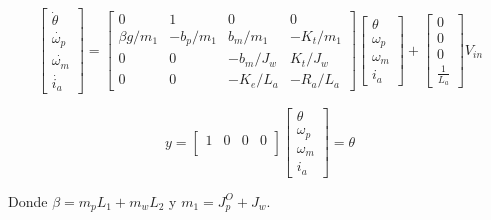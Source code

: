 \documentclass{article}
\begin{document}
    \begin{equation*}
        \left[
            \begin{matrix}
                \dot{\theta}\\
                \dot{\omega_p}\\
                \dot{\omega_m}\\
                \dot{i_a}
            \end{matrix}
        \right]
        =
        \left[
        \begin{matrix}
            0           & 1         & 0         & 0\\
            \beta g/m_1   & -b_p/m_1  & b_m/m_1   & -K_t/m_1\\
            0           & 0         & -b_m/J_w  & K_t/J_w\\
            0           & 0         & -K_e/L_a  & -R_a/L_a
        \end{matrix}
        \right]
        \left[
        \begin{matrix}
            \theta\\
            \omega_p\\
            \omega_m\\
            i_a
        \end{matrix}
        \right]
        +
        \left[
        \begin{matrix}
            0\\
            0\\
            0\\
            \frac{1}{L_a}
        \end{matrix}
        \right]
        V_{in}
    \end{equation*}

    \begin{equation*}
        y = 
        \left[
        \begin{matrix}
            1 & 0 & 0 & 0\\
        \end{matrix}
        \right]
        \left[
        \begin{matrix}
            \theta\\
            \omega_p\\
            \omega_m\\
            i_a
        \end{matrix}
        \right]
        = \theta
    \end{equation*}

Donde $\beta = m_p L_1 + m_w L_2$ y $m_1 = J_p^O + J_w$.
\end{document}
